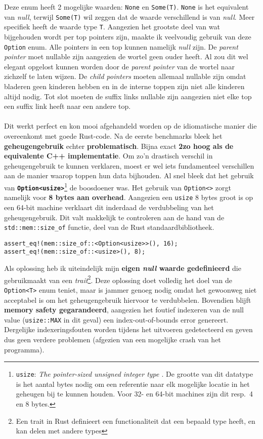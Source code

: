Deze enum heeft 2 mogelijke waarden: \texttt{None} en \texttt{Some(T)}.
\texttt{None} is het equivalent van \textit{null}, terwijl \texttt{Some(T)} wil zeggen dat de waarde verschillend is van \textit{null}.
Meer specifiek heeft de waarde type \texttt{T}.
Aangezien het grootste deel van wat bijgehouden wordt per top pointers zijn, maakte ik veelvoudig gebruik van deze \texttt{Option} enum.
Alle pointers in een top kunnen namelijk \textit{null} zijn.
De \textit{parent pointer} moet nullable zijn aangezien de wortel geen ouder heeft.
Al zou dit wel elegant opgelost kunnen worden door de \textit{parent pointer} van de wortel naar zichzelf te laten wijzen.
De \textit{child pointers} moeten allemaal nullable zijn omdat bladeren geen kinderen hebben en in de interne toppen zijn niet alle kinderen altijd nodig.
Tot slot moeten de suffix links nullable zijn aangezien niet elke top een suffix link heeft naar een andere top.
\\ \\
Dit werkt perfect en kon mooi afgehandeld worden op de idiomatische manier die overeenkomt met goede Rust-code.
Na de eerste benchmarks bleek het \textbf{geheugengebruik} echter \textbf{problematisch}.
Bijna exact \textbf{2\times zo hoog als de equivalente C++ implementatie}.
Om zo'n drastisch verschil in geheugengebruik te kunnen verklaren, moest er wel iets fundamenteel verschillen aan de manier waarop toppen hun data bijhouden.
Al snel bleek dat het gebruik van \textbf{\texttt{Option<usize>}}\footnote{\texttt{usize}: \textit{The pointer-sized unsigned integer type \cite{usize}}. De grootte van dit datatype is het aantal bytes nodig om een referentie naar elk mogelijke locatie in het geheugen bij te kunnen houden. Voor 32- en 64-bit machines zijn dit resp.~4 en 8 bytes.} de boosdoener was.
Het gebruik van \texttt{Option<>} zorgt namelijk voor \textbf{8 bytes aan overhead}.
Aangezien een \texttt{usize} 8 bytes groot is op een 64-bit machine verklaart dit inderdaad de verdubbeling van het geheugengebruik.
Dit valt makkelijk te controleren aan de hand van de \texttt{std::mem::size\_of} functie, deel van de Rust standaardbibliotheek.
\begin{verbatim}
assert_eq!(mem::size_of::<Option<usize>>(), 16);
assert_eq!(mem::size_of::<usize>(), 8);
\end{verbatim}

Als oplossing heb ik uiteindelijk mijn \textbf{eigen \textit{null} waarde gedefinieerd} die gebruikmaakt van een \textit{trait}\footnote{Een trait in Rust definieert een functionaliteit dat een bepaald type heeft, en kan delen met andere types}.
Deze oplossing doet volledig het doel van de \texttt{Option<T>} enum teniet, maar is jammer genoeg nodig omdat het gewoonweg niet acceptabel is om het geheugengebruik hiervoor te verdubbelen.
Bovendien blijft \textbf{memory safety gegarandeerd}, aangezien het foutief indexeren van de null value (\texttt{usize::MAX} in dit geval) een index-out-of-bounds error genereert.
Dergelijke indexeringsfouten worden tijdens het uitvoeren gedetecteerd en geven dus geen verdere problemen (afgezien van een mogelijke crash van het programma).

